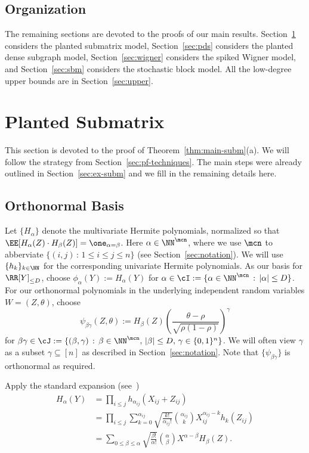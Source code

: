 \documentclass[11pt]{article}
\begin{document}
\subsection*{Organization}

The remaining sections are devoted to the proofs of our main results. Section~\ref{sec:subm} considers the planted submatrix model, Section~\ref{sec:pds} considers the planted dense subgraph model, Section~\ref{sec:wigner} considers the spiked Wigner model, and Section~\ref{sec:sbm} considers the stochastic block model. All the low-degree upper bounds are in Section~\ref{sec:upper}.




\section{Planted Submatrix}
\label{sec:subm}

This section is devoted to the proof of Theorem~\ref{thm:main-subm}(a). We will follow the strategy from Section~\ref{sec:pf-techniques}. The main steps were already outlined in Section~\ref{sec:ex-subm} and we fill in the remaining details here.


\subsection{Orthonormal Basis}

Let $\{H_\alpha\}$ denote the multivariate Hermite polynomials, normalized so that $\EE[H_\alpha(Z) \cdot H_\beta(Z)] = \one_{\alpha=\beta}$. Here $\alpha \in \NN^{\mcn}$, where we use ${\mcn}$ to abberviate ${\{(i,j) \,:\, 1 \le i \le j \le n\}}$ (see Section~\ref{sec:notation}). We will use $\{h_k\}_{k \in \NN}$ for the corresponding univariate Hermite polynomials. As our basis for $\RR[Y]_{\le D}$, choose $\phi_\alpha(Y) := H_\alpha(Y)$ for $\alpha \in \cI := \{\alpha \in \NN^{\mcn} \,:\, |\alpha| \le D\}$. For our orthonormal polynomials in the underlying independent random variables $W = (Z,\theta)$, choose
\[ \psi_{\beta\gamma}(Z,\theta) := H_\beta(Z) \left(\frac{\theta-\rho}{\sqrt{\rho(1-\rho)}}\right)^\gamma \]
for $\beta\gamma \in \cJ := \{(\beta,\gamma) \,:\, \beta \in \NN^{\mcn}, \, |\beta| \le D, \, \gamma \in \{0,1\}^n\}$. We will often view $\gamma$ as a subset $\gamma \subseteq [n]$ as described in Section~\ref{sec:notation}. Note that $\{\psi_{\beta\gamma}\}$ is orthonormal as required.

Apply the standard expansion (see~\cite[Proposition~3.1]{SW-estimation})
\begin{align*}
H_\alpha(Y) &= \prod_{i \le j} h_{\alpha_{ij}}(X_{ij} + Z_{ij}) \\
&= \prod_{i \le j} \sum_{k = 0}^{\alpha_{ij}} \sqrt{\frac{k!}{\alpha_{ij}!}} \binom{\alpha_{ij}}{k} X_{ij}^{\alpha_{ij} - k} h_k(Z_{ij}) \\
&= \sum_{0 \le \beta \le \alpha} \sqrt{\frac{\beta!}{\alpha!}} \binom{\alpha}{\beta} X^{\alpha-\beta} H_\beta(Z).
\end{align*}
\end{document}
